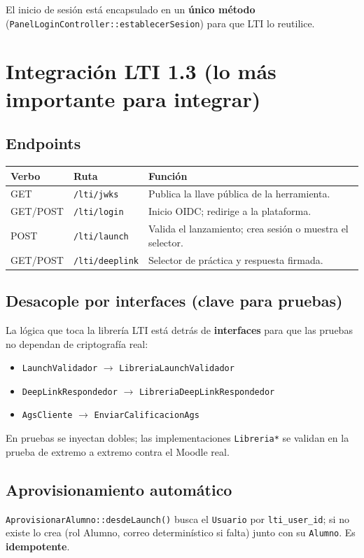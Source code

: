 \documentclass[11pt,letterpaper]{article}
\begin{document}
El inicio de sesión está encapsulado en un \textbf{único método}
(\texttt{PanelLoginController::establecerSesion}) para que LTI lo reutilice.

\section{Integración LTI 1.3 (lo más importante para integrar)}

\subsection{Endpoints}
\begin{longtable}{p{1.1cm} p{4.6cm} p{8.4cm}}
\toprule \textbf{Verbo} & \textbf{Ruta} & \textbf{Función} \\ \midrule
\endhead
GET & \texttt{/lti/jwks} & Publica la llave pública de la herramienta. \\
GET/POST & \texttt{/lti/login} & Inicio OIDC; redirige a la plataforma. \\
POST & \texttt{/lti/launch} & Valida el lanzamiento; crea sesión o muestra el selector. \\
GET/POST & \texttt{/lti/deeplink} & Selector de práctica y respuesta firmada. \\
\bottomrule
\end{longtable}

\subsection{Desacople por interfaces (clave para pruebas)}
La lógica que toca la librería LTI está detrás de \textbf{interfaces} para que las
pruebas no dependan de criptografía real:
\begin{itemize}[leftmargin=1.3em,nosep]
  \item \texttt{LaunchValidador} $\rightarrow$ \texttt{LibreriaLaunchValidador}
  \item \texttt{DeepLinkRespondedor} $\rightarrow$ \texttt{LibreriaDeepLinkRespondedor}
  \item \texttt{AgsCliente} $\rightarrow$ \texttt{EnviarCalificacionAgs}
\end{itemize}
En pruebas se inyectan dobles; las implementaciones \texttt{Libreria*} se validan
en la prueba de extremo a extremo contra el Moodle real.

\subsection{Aprovisionamiento automático}
\texttt{AprovisionarAlumno::desdeLaunch()} busca el \texttt{Usuario} por
\texttt{lti\_user\_id}; si no existe lo crea (rol Alumno, correo determinístico si
falta) junto con su \texttt{Alumno}. Es \textbf{idempotente}.
\end{document}
